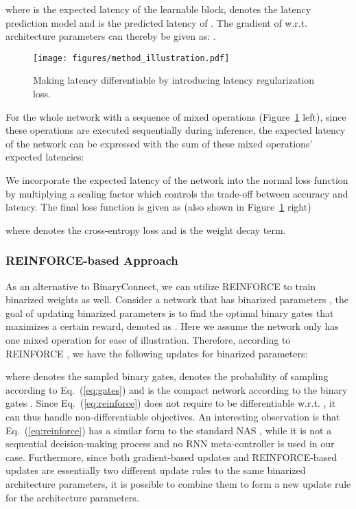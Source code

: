\documentclass{article} \usepackage{iclr2019_conference,times}
\begin{document}
where  is the expected latency of the  learnable block,  denotes the latency prediction model and  is the predicted latency of . The gradient of  w.r.t. architecture parameters can thereby be given as: .

\begin{figure}[t]
\centering
    \texttt{[image: figures/method\_illustration.pdf]}
\caption{Making latency differentiable by introducing latency regularization loss.}
    \label{fig:expected_latency}
\end{figure}

For the whole network with a sequence of mixed operations (Figure~\ref{fig:expected_latency} left), since these operations are executed sequentially during inference, the expected latency of the network can be expressed with the sum of these mixed operations' expected latencies:

We incorporate the expected latency of the network into the normal loss function by multiplying a scaling factor  which controls the trade-off between accuracy and latency. The final loss function is given as (also shown in Figure~\ref{fig:expected_latency} right)

where  denotes the cross-entropy loss and  is the weight decay term. 

\subsubsection{REINFORCE-based Approach}\label{sec:reinforce_algo}
As an alternative to BinaryConnect, we can utilize REINFORCE to train binarized weights as well. Consider a network that has binarized parameters , the goal of updating binarized parameters is to find the optimal binary gates  that maximizes a certain reward, denoted as . Here we assume the network only has one mixed operation for ease of illustration. Therefore, according to REINFORCE \citep{williams1992simple}, we have the following updates for binarized parameters:

where  denotes the  sampled binary gates,  denotes the probability of sampling  according to Eq.~(\ref{eq:gates}) and  is the compact network according to the binary gates . Since Eq.~(\ref{eq:reinforce}) does not require  to be differentiable w.r.t. , it can thus handle non-differentiable objectives. An interesting observation is that Eq.~(\ref{eq:reinforce}) has a similar form to the standard NAS \citep{zoph2016neural}, while it is not a sequential decision-making process and no RNN meta-controller is used in our case. Furthermore, since both gradient-based updates and REINFORCE-based updates are essentially two different update rules to the same binarized architecture parameters, it is possible to combine them to form a new update rule for the architecture parameters. 
 
\end{document}
